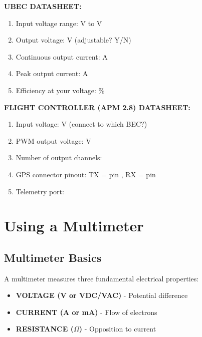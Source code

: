 \documentclass[11pt,letterpaper]{article}
\begin{document}
\textbf{UBEC DATASHEET:}
\begin{enumerate}
\item Input voltage range: \underline{\hspace{2cm}} V to \underline{\hspace{2cm}} V
\item Output voltage: \underline{\hspace{2cm}} V (adjustable? Y/N)
\item Continuous output current: \underline{\hspace{2cm}} A
\item Peak output current: \underline{\hspace{2cm}} A
\item Efficiency at your voltage: \underline{\hspace{2cm}} \%
\end{enumerate}

\textbf{FLIGHT CONTROLLER (APM 2.8) DATASHEET:}
\begin{enumerate}
\item Input voltage: \underline{\hspace{2cm}} V (connect to which BEC?)
\item PWM output voltage: \underline{\hspace{2cm}} V
\item Number of output channels: \underline{\hspace{2cm}}
\item GPS connector pinout: TX = pin \underline{\hspace{1cm}}, RX = pin \underline{\hspace{1cm}}
\item Telemetry port: \underline{\hspace{3cm}}
\end{enumerate}

\newpage
\section{Using a Multimeter}

\subsection{Multimeter Basics}

A multimeter measures three fundamental electrical properties:
\begin{itemize}
\item \textbf{VOLTAGE (V or VDC/VAC)} - Potential difference
\item \textbf{CURRENT (A or mA)} - Flow of electrons
\item \textbf{RESISTANCE ($\Omega$)} - Opposition to current
\end{itemize}
\end{document}
